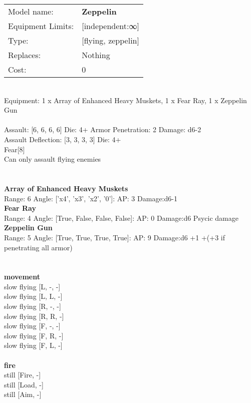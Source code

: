 \noindent
\begin{tabular}{ll}
Model name: &{\bf Zeppelin } \\
Equipment Limits: &[independent:∞] \\
Type: &[flying, zeppelin] \\
Replaces: &Nothing \\
Cost: & 0\\
\end{tabular}
\ \\
Equipment: 1 x Array of Enhanced Heavy Muskets, 1 x Fear Ray, 1 x Zeppelin Gun \\
\ \\
Assault: [6, 6, 6, 6] Die: 4+ Armor Penetration: 2 Damage: d6-2 \\
Assault Deflection: [3, 3, 3, 3] Die: 4+\\
\indent Fear[8]\\ 
Can only assault flying enemies\\ 
 
\ \\

\ \\
{\bf Array of Enhanced Heavy Muskets } \\



Range: 6  Angle: ['x4', 'x3', 'x2', '0']: AP: 3 Damage:d6-1 \\




{\bf Fear Ray } \\



Range: 4  Angle: [True, False, False, False]: AP: 0 Damage:d6 Psycic damage \\




{\bf Zeppelin Gun } \\



Range: 5  Angle: [True, True, True, True]: AP: 9 Damage:d6 +1 +(+3 if penetrating all armor) \\




 
\ \\



\ \\ {\bf movement } \\
slow flying [L, -, -] \\
slow flying [L, L, -] \\
slow flying [R, -, -] \\
slow flying [R, R, -] \\
slow flying [F, -, -] \\
slow flying [F, R, -] \\
slow flying [F, L, -] \\
\ \\ {\bf fire } \\
still [Fire, -] \\
still [Load, -] \\
still [Aim, -] \\


